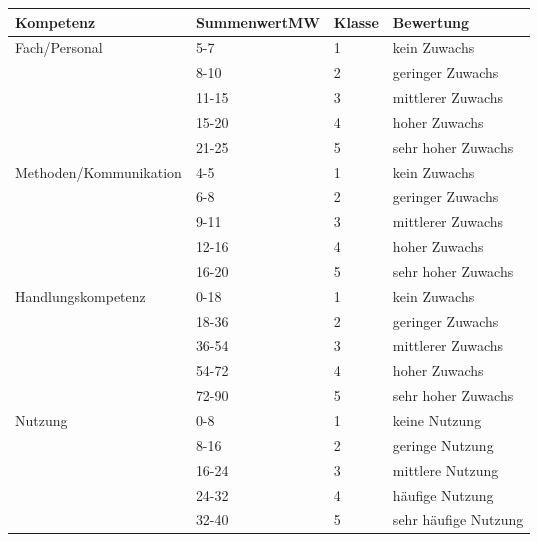 \begin{table}[H]
\centering
\begin{tabular}{@{}llll@{}}
\toprule
Kompetenz              & SummenwertMW & Klasse & Bewertung          \\ \midrule
Fach/Personal          & 5-7        & 1      & kein Zuwachs       \\
                       & 8-10       & 2      & geringer Zuwachs   \\
                       & 11-15      & 3      & mittlerer Zuwachs  \\
                       & 15-20      & 4      & hoher Zuwachs      \\
                       & 21-25      & 5      & sehr hoher Zuwachs \\ \cmidrule(r){1-4}
Methoden/Kommunikation & 4-5        & 1      & kein Zuwachs       \\
                       & 6-8        & 2      & geringer Zuwachs   \\
                       & 9-11       & 3      & mittlerer Zuwachs  \\
                       & 12-16      & 4      & hoher Zuwachs      \\
                       & 16-20      & 5      & sehr hoher Zuwachs \\ 
                       \cmidrule(r){1-4}
Handlungskompetenz 	& 0-18       & 1      & kein Zuwachs       \\
                       & 18-36        & 2      & geringer Zuwachs   \\
                       & 36-54       & 3      & mittlerer Zuwachs  \\
                       & 54-72      & 4      & hoher Zuwachs      \\
                       & 72-90      & 5      & sehr hoher Zuwachs \\ 
                       \cmidrule(r){1-4}
Nutzung	& 0-8       & 1      & keine Nutzung       \\
                       & 8-16        & 2      & geringe Nutzung   \\
                       & 16-24       & 3      & mittlere Nutzung  \\
                       & 24-32     & 4      & häufige Nutzung      \\
                       & 32-40      & 5      & sehr häufige Nutzung \\ 
                       \bottomrule
\end{tabular}
\end{table}
